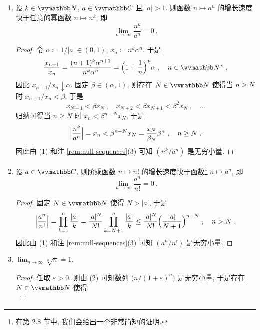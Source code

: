 \begin{example}
\begin{enumerate}
\begin{proof}
            设 \(|a| \geq 1\) 且 \(a \neq 1\). 假设 \((a^n)\) 收敛, 则由上面的结论可知 \(\bigl(|a^n|\bigr)\) 是无穷小量, 但是对于任意 \(n \in \N\) 都有 \(|a^n| = |a|^n \geq 1\), 矛盾. 故 \((a^n)\) 发散.
        \end{proof}
        \item 设 \(k \in \N\), \(a \in \C\) 且 \(|a| > 1\). 则函数 \(n \mapsto a^n\) 的增长速度快于任意的幂函数 \(n \mapsto n^k\), 即
        \[
            \lim_{n \to \infty} \frac{n^k}{a^n} = 0\ .
        \]
        \begin{proof}
            令 \(\alpha \coloneqq 1 \big/ |a| \in (0, 1)\), \(x_n \coloneqq n^k \alpha^n\). 于是
            \[
                \frac{x_{n + 1}}{x_n} = \frac{(n + 1)^k \alpha^{n + 1}}{n^k \alpha^n} = \Bigl(1 + \frac{1}{n}\Bigr)^k \alpha\ ,\quad n \in \N^\ast\ ,
            \]
            因此 \(x_{n + 1} / x_n \downarrow \alpha\). 固定 \(\beta \in (\alpha, 1)\), 则存在 \(N \in \N\) 使得当 \(n \geq N\) 时 \(x_{n + 1} / x_n < \beta\), 于是
            \[
                x_{N + 1} < \beta x_N\ ,\quad x_{N + 2} < \beta x_{N + 1} < \beta^2 x_N\ ,\quad \ldots
            \]
            归纳可得当 \(n \geq N\) 时 \(x_n < \beta^{n - N} x_N\), 于是
            \[
                \Bigl|\frac{n^k}{a^n}\Bigr| = x_n < \beta^{n - N} x_N = \frac{x_N}{\beta_N} \beta^n\ ,\quad n \geq N\ .
            \]
            因此由 (1) 和注 \ref{rem:null-sequences}(3) 可知 \((n^k / a^n)\) 是无穷小量.
        \end{proof}
        \item 设 \(a \in \C\). 则阶乘函数 \(n \mapsto n!\) 的增长速度快于函数\footnote{在第 2.8 节中, 我们会给出一个非常简短的证明.} \(n \mapsto a^n\), 即
        \[
            \lim_{n \to \infty} \frac{a^n}{n!} = 0\ .
        \]
        \begin{proof}
            固定 \(N \in \N\) 使得 \(N > |a|\), 于是
            \[
                \Bigl|\frac{a^n}{n!}\Bigr| = \prod_{k = 1}^n \frac{|a|}{k} = \frac{|a|^N}{N!} \prod_{k = N + 1}^n \frac{|a|}{k} \leq \frac{|a|^N}{N!} \Bigl(\frac{|a|}{N + 1}\Bigr)^{n - N}\ ,\quad n > N\ ,
            \]
            因此由 (1) 和注 \ref{rem:null-sequences}(3) 可知 \((a^n / n!)\) 是无穷小量.
        \end{proof}
        \item \(\displaystyle \lim_{n \to \infty} \sqrt[n]{n} = 1\).
        \begin{proof}
            任取 \(\varepsilon > 0\). 则由 (2) 可知数列 \(\bigl(n / (1 + \varepsilon)^n\bigr)\) 是无穷小量, 于是存在 \(N \in \N\) 使得
            \[
\]
\end{proof}
\end{enumerate}
\end{example}
